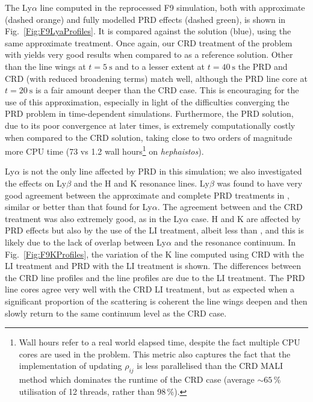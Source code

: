 The Ly$\alpha$ line computed in the reprocessed F9 simulation, both with approximate (dashed orange) and fully modelled PRD effects (dashed green), is shown in Fig.~\ref{Fig:F9LyaProfiles}.
It is compared against the \Radyn{} solution (blue), using the same approximate treatment.
Once again, our CRD treatment of the problem with \Lw{} yields very good results when compared to \Radyn{} as a reference solution.
Other than the line wings at $t=\SI{5}{\second}$ and to a lesser extent at $t=\SI{40}{\second}$ the PRD and CRD (with reduced broadening terms) match well, although the PRD line core at $t=\SI{20}{\second}$ is a fair amount deeper than the CRD case.
This is encouraging for the use of this approximation, especially in light of the difficulties converging the PRD problem in time-dependent simulations.
Furthermore, the PRD solution, due to its poor convergence at later times, is extremely computationally costly when compared to the CRD solution, taking close to two orders of magnitude more CPU time (73 vs 1.2 wall hours\footnote{Wall hours refer to a real world elapsed time, despite the fact multiple CPU cores are used in the problem. This metric also captures the fact that the implementation of updating $\rho_{ij}$ is less parallelised \Lw{} than the CRD MALI method which dominates the runtime of the CRD case (average $\sim65$\,\% utilisation of 12 threads, rather than 98\,\%).} on \emph{hephaistos}).

Ly$\alpha$ is not the only line affected by PRD in this simulation; we also investigated the effects on Ly$\beta$ and the \Caii{} H and K resonance lines.
Ly$\beta$ was found to have very good agreement between the approximate and complete PRD treatments in \Lw{}, similar or better than that found for Ly$\alpha$.
The agreement between \Radyn{} and the \Lw{} CRD treatment was also extremely good, as in the Ly$\alpha$ case.
\Caii{} H and K are affected by PRD effects but also by the use of the LI treatment, albeit less than \CaLine{}, and this is likely due to the lack of overlap between Ly$\alpha$ and the \Caii{} resonance continuum.
In Fig.~\ref{Fig:F9KProfiles}, the variation of the \Caii{} K line computed using CRD with the LI treatment and PRD with the LI treatment is shown.
The differences between the CRD line profiles and the \Radyn{} line profiles are due to the LI treatment.
The PRD line cores agree very well with the CRD LI treatment, but as expected when a significant proportion of the scattering is coherent the line wings deepen and then slowly return to the same continuum level as the CRD case.

